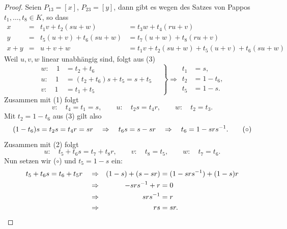 \documentclass[
 a4paper,
 12pt,
 parskip=half
 ]{scrartcl}
\theoremstyle{plain}
\theoremstyle{definition}
\begin{document}
\begin{proof}
 Seien $P_{13} = [x]$, $P_{23} = [y]$, dann gibt es wegen des Satzes von Pappos $t_1, \ldots, t_8 \in K$, so dass
 \begin{align*}
    x &=   &   t_1 v + t_2 (su+w) &= t_3 w + t_4 (ru+v) \tag{1} \\
    y &=   &   t_5 (u+v) + t_6 (su+w) &= t_7 (u+w) + t_8 (ru+v) \tag{2} \\
  x+y &=   &   u+v+w &= t_1 v + t_2 (su+w) + t_5 (u+v) + t_6 (su+w) \tag{3}
 \end{align*}
 Weil $u,v,w$ linear unabhängig sind, folgt aus (3)
 \[ \left. \begin{aligned}
    w: \quad 1 &= t_2 + t_6 \\
    u: \quad 1 &= (t_2+t_6) s + t_5 = s + t_5 \\
    v: \quad 1 &= t_1 + t_5
    \end{aligned}
    \quad \right\} \Rightarrow 
    \begin{aligned}
     t_1 &= s, \\
     t_2 &= 1 - t_6, \\
     t_5 &= 1 - s. 
    \end{aligned} \]
 Zusammen mit (1) folgt
 \[ v: \quad t_4 = t_1 = s, \qquad u: \quad t_2 s = t_4 r, \qquad w: \quad t_2 = t_3. \]
 Mit $t_2 = 1 - t_6$ aus (3) gilt also
 \[ (1-t_6)s = t_2 s = t_4 r = sr \quad \Rightarrow \quad t_6 s = s - sr \quad \Rightarrow \quad t_6 = 1 - srs^{-1}. \tag{$\circ$} \]
 Zusammen mit (2) folgt
 \[ u: \quad t_5 + t_6s = t_7 + t_8 r, \qquad v: \quad t_8 = t_5, \qquad w: \quad t_7 = t_6. \]
 Nun setzen wir ($\circ$) und $t_5 = 1-s$ ein:
 \begin{align*}
     t_5 + t_6 s = t_6 + t_5 r \quad
     &\Rightarrow & (1-s) + (s-sr) &= (1 - srs^{-1}) + (1-s)r \\
     &\Rightarrow & -srs^{-1} + r &= 0 \\
     &\Rightarrow & srs^{-1} &= r \\
     &\Rightarrow & rs &= sr. \qedhere 
 \end{align*}
\end{proof}
\end{document}
